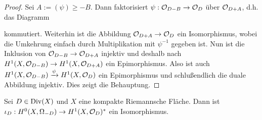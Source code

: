 \begin{proof}
  Sei $A := (\psi) \geq -B$. Dann faktorisiert $\psi: \mathcal{O}_{D-B} \rightarrow
  \mathcal{O}_D$ über $\mathcal{O}_{D+A}$, d.h. das Diagramm
  \begin{center}
  \end{center}
  kommutiert. Weiterhin ist die Abbildung $\mathcal{O}_{D+A} \rightarrow \mathcal{O}_D$ ein
  Isomorphismus, wobei die Umkehrung einfach durch Multiplikation mit
  $\psi^{-1}$ gegeben ist. Nun ist die Inklusion von $\mathcal{O}_{D-B} \rightarrow
  \mathcal{O}_{D+A}$ injektiv und deshalb nach \cite[Satz 16.8]{For} $H^1(X, \mathcal{O}_{D-B}) \rightarrow
  H^1(X, \mathcal{O}_{D+A})$ ein Epimorphismus. Also ist auch $H^1(X,
  \mathcal{O}_{D-B}) \xrightarrow{\psi} H^1(X, \mathcal{O}_D)$ ein Epimorphismus und
  schlußendlich die duale Abbildung injektiv. Dies zeigt die Behauptung.
\end{proof}

\begin{thm}
  \label{thm:serre}
  Sei $D \in \operatorname{Div}(X)$ und $X$ eine kompakte Riemannsche Fläche. Dann
  ist $\iota_D: H^0(X, \Omega_{-D}) \rightarrow H^1(X, \mathcal{O}_D)^\ast$ ein Isomorphismus.
\end{thm}

